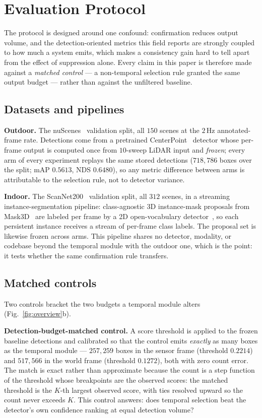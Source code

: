 \section{Evaluation Protocol}
\label{sec:protocol}

The protocol is designed around one confound: confirmation reduces output
volume, and the detection-oriented metrics this field reports are strongly
coupled to how much a system emits, which makes a consistency gain hard to
tell apart from the effect of suppression alone. Every claim in this paper is
therefore made against a \emph{matched control} --- a non-temporal selection
rule granted the same output budget --- rather than against the unfiltered
baseline.

\subsection{Datasets and pipelines}
\label{sec:datasets}
\noindent\textbf{Outdoor.} The nuScenes~\cite{nuscenes} validation split, all
$150$ scenes at the $2$\,Hz annotated-frame rate. Detections come from a
pretrained CenterPoint~\cite{centerpoint} detector whose per-frame output is
computed once from $10$-sweep LiDAR input and \emph{frozen}; every arm of every
experiment replays the same stored detections ($718{,}786$ boxes over the
split; mAP $0.5613$, NDS $0.6480$), so any metric difference between arms is attributable to the
selection rule, not to detector variance.

\noindent\textbf{Indoor.} The ScanNet200~\cite{scannet200} validation split,
all $312$ scenes, in a streaming instance-segmentation pipeline: class-agnostic
3D instance-mask proposals from Mask3D~\cite{mask3d} are labeled per frame by a
2D open-vocabulary detector~\cite{yoloworld}, so each persistent instance
receives a stream of per-frame class labels. The proposal set is likewise
frozen across arms. This pipeline shares no detector, modality, or codebase
beyond the temporal module with the outdoor one, which is the point: it tests
whether the same confirmation rule transfers.

\subsection{Matched controls}
\label{sec:controls}
Two controls bracket the two budgets a temporal module alters
(Fig.~\ref{fig:overview}b).

\noindent\textbf{Detection-budget-matched control.} A score threshold is
applied to the frozen baseline detections and calibrated so that the control
emits \emph{exactly} as many boxes as the temporal module --- $257{,}259$
boxes in the sensor frame (threshold $0.2214$) and $517{,}566$ in the world
frame (threshold $0.1272$), both with zero count error. The match is exact
rather than approximate because the count is a step function of the
threshold whose breakpoints are the observed scores: the matched threshold is
the $K$-th largest observed score, with ties resolved upward so the count
never exceeds $K$. This control answers: does temporal selection beat the
detector's own confidence ranking at equal detection volume?

